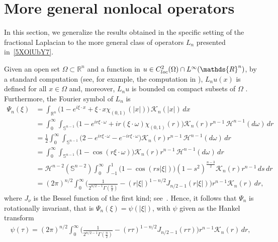 \documentclass[a4paper,12pt,reqno]{amsart}
\numberwithin{equation}{section}
\theoremstyle{definition}
\theoremstyle{notation}
\newcommand{\R}{\mathds{R}}
\newcommand{\sph}{\mathds{S}}
\newcommand{\jj}{{\mathcal{K}}}
\begin{document}
\section{More general nonlocal operators}\label{OJSDLN09ryihfjg9reSTRpsdlmvIJJ}
In this section, we generalize the results obtained in the specific setting of the fractional Laplacian to the more general class of operators $L_n$ presented in~\eqref{5XOlUbY7}. 


Given an open set \(\Omega \subset \R^n\) and a function in \(u\in C^2_{{\rm{loc}}}(\Omega) \cap L^\infty(\R^n)\), by a standard computation (see, for example, the computation in \cite[p.~9]{BUC}%
), \(L_n u(x)\) is defined for all \(x\in \Omega\) and, moreover, $L_nu$ is bounded on compact subsets of $\Omega$%
. Furthermore, the Fourier symbol of \(L_n\) is
\begin{equation}\begin{split}\label{Coqkf:FR}
 \Psi_n (\xi) & {} = \int_{\R^n} \big ( 1 - e^{i \xi \cdot x} + \xi \cdot x \chi_{(0,1)}(|x|) \big ) \, \jj_n(|x|) \, dx \\
 &= \int_0^\infty \int_{\sph^{n-1}} \big ( 1%
 - e^{i r \xi \cdot \omega } + i r(\xi \cdot \omega ) \chi_{(0,1)}(r) \big ) \jj_n(r) r^{n - 1}  \,  \mathcal H^{n-1}(d\omega) \, dr \\
    &= \frac12 \int_0^\infty \int_{\sph^{n-1}} \big ( 2 - e^{i r \xi \cdot \omega } -e^{-i r \xi \cdot \omega }  \big ) \jj_n(r) r^{n - 1} \, \mathcal H^{n-1}(d\omega) \, dr \\
    &=\int_0^\infty \int_{\sph^{n-1}} \big ( 1 - \cos( r \xi \cdot \omega  ) \big ) \jj_n(r) r^{n - 1} \,  \mathcal H^{n-1}(d\omega) \, dr \\ 
    &= \mathcal H^{n-2}(\sph^{n-2}) \int_0^\infty \int_{-1}^1 \big ( 1 - \cos( r s |\xi| ) \big ) (1 - s^2)^{\frac{n - 3}{2}} \jj_n(r) r^{n - 1} \, ds \, dr \\
    & = (2 \pi)^{n/2} \int_0^\infty \biggl(\frac{1}{2^{n/2 - 1} \Gamma(\frac{n}{2})} - (r |\xi|)^{1 - n/2} J_{n/2 - 1}(r |\xi|) \biggr) r^{n - 1} \jj_n(r) \, dr ,
\end{split}\end{equation}
where $J_\nu$ is the Bessel function of the first kind; see~\cite[Chapter 10]{NIST:DLMF}. Hence, it follows that \(\Psi_n\) is rotationally invariant, that is \(\Psi_n(\xi)=\psi(\vert \xi \vert ) \), with $\psi$ given as the Hankel transform
\begin{align}
 \psi(\tau) = (2 \pi)^{n/2} \int_0^\infty \biggl(\frac{1}{2^{n/2 - 1} \Gamma(\frac{n}{2})} - (r \tau)^{1 - n/2} J_{n/2 - 1}(r \tau)\biggr) r^{n - 1} \jj_n(r) \, dr ,
\label{psidierre000}
\end{align} 
\end{document}
